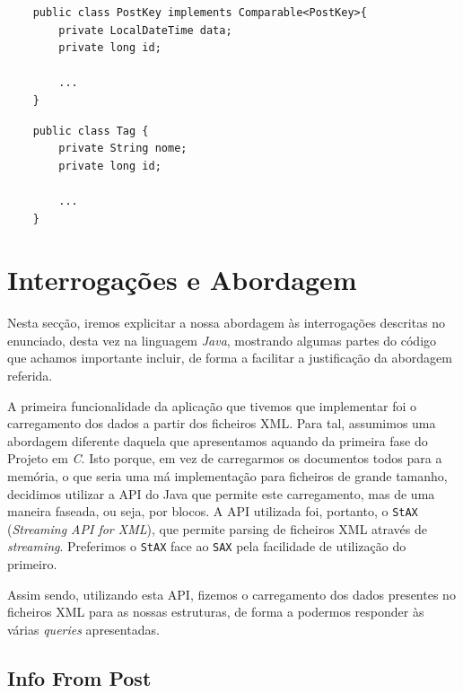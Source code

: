 \documentclass[a4paper, 11pt, oneside]{article}
\begin{document}
\begin{lstlisting}
	public class PostKey implements Comparable<PostKey>{
	    private LocalDateTime data;
	    private long id;

	    ...
	}
\end{lstlisting}

\begin{lstlisting}
	public class Tag {
	    private String nome;
	    private long id;

	    ...
	}
\end{lstlisting}





\section{Interrogações e Abordagem}

\label{queries}
Nesta secção, iremos explicitar a nossa abordagem às interrogações descritas no enunciado,
desta vez na linguagem \textit{Java}, mostrando algumas partes do código que
achamos importante incluir, de forma a facilitar a justificação da abordagem referida.


A primeira funcionalidade da aplicação que tivemos que implementar foi o carregamento dos dados a partir dos ficheiros XML. Para tal, assumimos uma abordagem diferente daquela que apresentamos aquando da primeira fase do Projeto em \textit{C}. Isto porque, em vez de carregarmos os documentos todos para a memória, o que seria uma má implementação para ficheiros de grande tamanho, decidimos utilizar a API do Java que permite este carregamento, mas de uma maneira faseada, ou seja, por blocos. A API utilizada foi, portanto, o \texttt{StAX} (\textit{Streaming API for XML}), que permite parsing de ficheiros XML através de \textit{streaming}. Preferimos o \texttt{StAX} face ao \texttt{SAX} pela facilidade de utilização do primeiro.

Assim sendo, utilizando esta API, fizemos o carregamento dos dados presentes no ficheiros XML para as nossas estruturas, de forma a podermos responder às várias \textit{queries} apresentadas.


\subsection{Info From Post}
\end{document}
